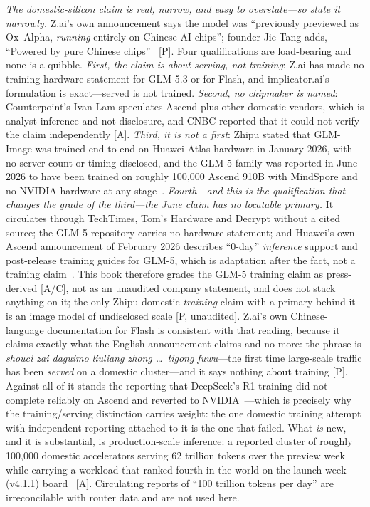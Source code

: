 \emph{The domestic-silicon claim is real, narrow, and easy to overstate---so state it narrowly.} Z.ai's own announcement says the model was ``previously previewed as Ox~Alpha, \emph{running} entirely on Chinese AI chips''; founder Jie Tang adds, ``Powered by pure Chinese chips''~\cite{glm53-chips} [P]. Four qualifications are load-bearing and none is a quibble. \emph{First, the claim is about serving, not training}: Z.ai has made no training-hardware statement for GLM-5.3 or for Flash, and implicator.ai's formulation is exact---served is not trained. \emph{Second, no chipmaker is named}: Counterpoint's Ivan Lam speculates Ascend plus other domestic vendors, which is analyst inference and not disclosure, and CNBC reported that it could not verify the claim independently [A]. \emph{Third, it is not a first}: Zhipu stated that GLM-Image was trained end to end on Huawei Atlas hardware in January 2026, with no server count or timing disclosed, and the GLM-5 family was reported in June 2026 to have been trained on roughly 100{,}000 Ascend 910B with MindSpore and no NVIDIA hardware at any stage~\cite{zhipu-ascend-prior}. \emph{Fourth---and this is the qualification that changes the grade of the third---the June claim has no locatable primary.} It circulates through TechTimes, Tom's Hardware and Decrypt without a cited source; the GLM-5 repository carries no hardware statement; and Huawei's own Ascend announcement of February 2026 describes ``0-day'' \emph{inference} support and post-release training guides for GLM-5, which is adaptation after the fact, not a training claim~\cite{glm5-ascend-unsourced}. This book therefore grades the GLM-5 training claim as press-derived [A/C], not as an unaudited company statement, and does not stack anything on it; the only Zhipu domestic-\emph{training} claim with a primary behind it is an image model of undisclosed scale [P, unaudited]. Z.ai's own Chinese-language documentation for Flash is consistent with that reading, because it claims exactly what the English announcement claims and no more: the phrase is \emph{shouci zai daguimo liuliang zhong \ldots\ tigong fuwu}---the first time large-scale traffic has been \emph{served} on a domestic cluster---and it says nothing about training [P]. Against all of it stands the reporting that DeepSeek's R1 training did not complete reliably on Ascend and reverted to NVIDIA~\cite{ascend-delay}---which is precisely why the training/serving distinction carries weight: the one domestic training attempt with independent reporting attached to it is the one that failed. What \emph{is} new, and it is substantial, is production-scale inference: a reported cluster of roughly 100{,}000 domestic accelerators serving 62 trillion tokens over the preview week while carrying a workload that ranked fourth in the world on the launch-week (v4.1.1) board~\cite{glm53-chips} [A]. Circulating reports of ``100 trillion tokens per day'' are irreconcilable with router data and are not used here.

